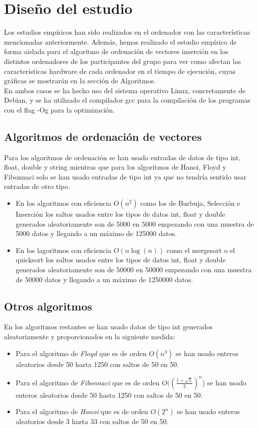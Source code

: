 \documentclass[11pt,openany]{book}
\begin{document}
\chapter{Diseño del estudio}

Los estudios empíricos han sido realizados en el ordenador con las características mencionadas anteriormente.
Además, hemos realizado el estudio empírico de forma aislada para el algoritmo de ordenación de vectores
inserción en los distintos ordenadores de los participantes del grupo para ver como afectan las características
hardware de cada ordenador en el tiempo de ejecución, cuyas gráficas se mostrarán en la sección de Algoritmos. \\
En ambos casos se ha hecho uso del sistema operativo Linux, concretamente de Debian, y se ha utilizado el
compilador gcc para la compilación de los programas  con el flag -Og para la optimización.
\section{Algoritmos de ordenación de vectores}
Para los algoritmos de ordenación se han usado entradas de datos de tipo int, float, double y string mientras que para los algoritmos de Hanoi, Floyd  y Fibonnaci solo se han usado entradas de tipo int
ya que no tendría sentido usar entradas de otro tipo.
\begin{itemize}
    \item En los algoritmos con eficiencia  \(O(n^2)\) como los de Burbuja, Selección e Inserción los saltos usados entre los tipos de datos int, float y double generados aleatoriamente son de 5000 en 5000 empezando con una muestra de 5000 datos y llegando a
          un máximo de 125000 datos.
    \item En los lagoritmos con eficiencia \(O (n\log(n))\) como el mergesort o el quicksort los saltos usados entre los tipos de datos int, float y double generados aleatoriamente son de 50000 en 50000 empezando con una muestra de 50000 datos y llegando a
          un máximo de 1250000 datos.
\end{itemize}

\section{Otros algoritmos}
En los algoritmos restantes se han usado datos de tipo int generados aleatoriamente y proporcionados en la siguiente medida:
\begin{itemize}
    \item Para el algoritmo de \textit{Floyd}  que es de orden \(O(n^3)\) se han usado enteros aleatorios desde 50 hasta 1250 con saltos de 50 en 50.
    \item Para el algoritmo de \textit{Fibonnaci}  que es de orden \(O((\frac{1+\sqrt{5}}{2})^n\)) se han usado enteros aleatorios desde 50 hasta 1250 con saltos de 50 en 50.
    \item Para el algoritmo de \textit{Hanoi} que es de orden \(O(2^n)\) se han usado enteros aleatorios desde 3 hasta 33 con saltos de 50 en 50.
\end{itemize}
\end{document}
